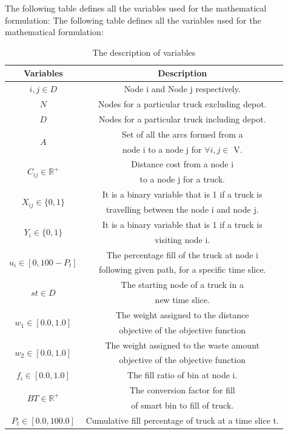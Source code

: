 \documentclass[12pt]{article}
\begin{document}
The following table defines all the variables used for the mathematical formulation:
The following table defines all the variables used for the mathematical formulation:
\begin{table}[H]\label{variables}
	\centering
	\caption{The description of variables}
	\begin{tabular*}{486pt}[H]{|c|c|}
		\hline \hspace{40pt} Variables \hspace{40pt} & \hspace{130pt} Description \hspace{130pt} \\
		\hline $i, j \in D$ & Node i and Node j respectively.\\
		\hline $N$ & Nodes for a particular truck excluding depot.\\
		\hline $D$ & Nodes for a particular truck including depot.\\
		\hline \multirow{2}{*}{$A$} & Set of all the arcs formed from a\\
		&  node i to a node j for $\forall i,j \in$ V.\\
		\hline \multirow{2}{*}{$C_{ij}\in \mathbb{R}^+$} & Distance cost from a node i\\
		& to a node j for a truck.\\
		\hline \multirow{2}{*}{$X_{ij} \in \{0, 1\}$} & It is a binary variable that is 1 if a truck is\\
		& travelling between the node i and node j.\\  
		\hline \multirow{2}{*}{$Y_{i} \in \{0, 1\}$} & It is a binary variable that is 1 if a truck is \\
		& visiting node i.\\
		\hline \multirow{2}{*}{$u_{i}  \in [0, 100 -P_{t}] $} & The percentage fill of the truck at node i \\
		& following given path, for a specific time slice.\\
		\hline \multirow{2}{*}{$st \in D$} & The starting node of a truck in a\\
		& new time slice.\\
		\hline \multirow{2}{*}{$w_{1} \in [0.0, 1.0]$} & The weight assigned to the distance \\
		& objective of the objective function\\
		\hline \multirow{2}{*}{$w_{2} \in [0.0, 1.0]$} & The weight assigned to the waste amount \\
		& objective of the objective function\\
		\hline \multirow{1}{*}{$f_{i} \in [0.0, 1.0]$} & The fill ratio of bin at node i.\\
		\hline \multirow{2}{*}{$BT \in \mathbb{R}^+$} & The conversion factor for fill \\
		& of smart bin to fill of truck.\\
		\hline \multirow{1}{*}{$P_{t} \in [0.0, 100.0]$} & Cumulative fill percentage of truck at a time slice t.\\
		\hline
	\end{tabular*}
\end{table} 
\end{document}

